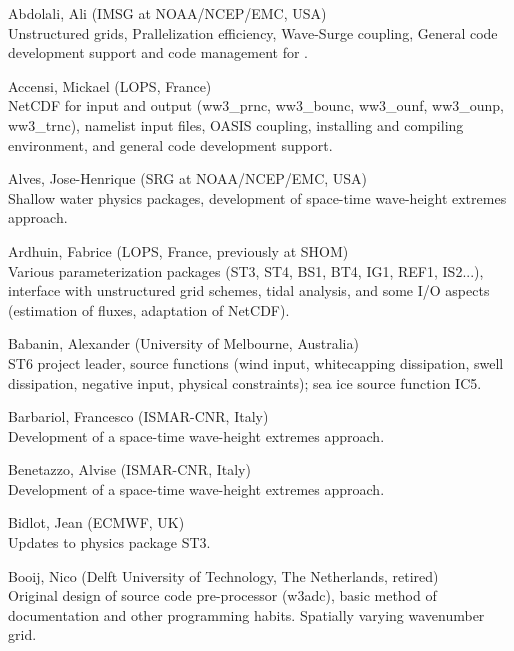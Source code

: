 \begin{list}{\ldots}{ }

\item [Abdolali, Ali] (IMSG at NOAA/NCEP/EMC, USA) \\
  Unstructured grids, Prallelization efficiency, Wave-Surge coupling, General code development support and code management for \ws.

\item [Accensi, Mickael] (LOPS, France) \\
  NetCDF for input and output (ww3\_prnc, ww3\_bounc, ww3\_ounf, ww3\_ounp, ww3\_trnc), namelist input files, OASIS coupling, installing and compiling environment, and general code development support.

\item [Alves, Jose-Henrique] (SRG at NOAA/NCEP/EMC, USA) \\
  Shallow water physics packages, development of space-time wave-height extremes approach.

\item [Ardhuin, Fabrice] (LOPS, France, previously at SHOM) \\
  Various parameterization packages (ST3, ST4, BS1, BT4, IG1, REF1, IS2...), interface with unstructured grid schemes, tidal analysis, and some I/O aspects (estimation of fluxes, adaptation of NetCDF). 

\item [Babanin, Alexander] (University of Melbourne, Australia)\\
  ST6 project leader, source functions (wind input, whitecapping dissipation, swell dissipation, negative input, physical constraints); sea ice source function IC5.

\item [Barbariol, Francesco] (ISMAR-CNR, Italy) \\
  Development of a space-time wave-height extremes approach.

\item [Benetazzo, Alvise] (ISMAR-CNR, Italy) \\
  Development of a space-time wave-height extremes approach.

\item [Bidlot, Jean] (ECMWF, UK) \\
  Updates to physics package ST3.

\item [Booij, Nico] (Delft University of Technology, The Netherlands, retired) \\
  Original design of source code pre-processor ({\code w3adc}), basic method
  of documentation and other programming habits. Spatially varying wavenumber
  grid.


\end{list}
